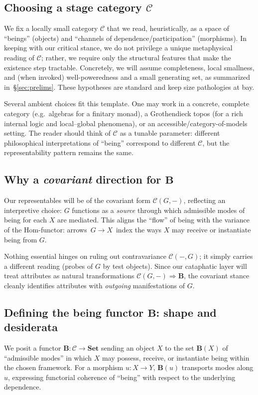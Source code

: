 \documentclass[11pt]{article}
\theoremstyle{upright}
\begin{document}
\subsection{Choosing a stage category \texorpdfstring{$\mathcal C$}{C}}
We fix a locally small category \(\mathcal C\) that we read, heuristically, as a space of ``beings'' (objects) and ``channels of dependence/participation'' (morphisms). In keeping with our critical stance, we do not privilege a unique metaphysical reading of \(\mathcal C\); rather, we require only the structural features that make the existence step tractable. Concretely, we will assume completeness, local smallness, and (when invoked) well-poweredness and a small generating set, as summarized in~\S\ref{sec:prelims}. These hypotheses are standard and keep size pathologies at bay.

Several ambient choices fit this template. One may work in a concrete, complete category (e.g.\ algebras for a finitary monad), a Grothendieck topos (for a rich internal logic and local--global phenomena), or an accessible/category-of-models setting. The reader should think of \(\mathcal C\) as a tunable parameter: different philosophical interpretations of ``being'' correspond to different \(\mathcal C\), but the representability pattern remains the same.

\subsection{Why a \emph{covariant} direction for \texorpdfstring{$\mathbf B$}{B}}
Our representables will be of the covariant form \(\mathcal C(G,-)\), reflecting an interpretive choice: \(G\) functions as a \emph{source} through which admissible modes of being for each \(X\) are mediated. This aligns the ``flow'' of being with the variance of the Hom-functor: arrows \(\,G\!\to\!X\) \,index the ways \(X\) may receive or instantiate being from \(G\).

Nothing essential hinges on ruling out contravariance \(\mathcal C(-,G)\); it simply carries a different reading (probes of \(G\) by test objects). Since our cataphatic layer will treat attributes as natural transformations \(\mathcal C(G,-)\Rightarrow \mathbf B\), the covariant stance cleanly identifies attributes with \emph{outgoing} manifestations of \(G\).

\subsection{Defining the being functor \texorpdfstring{$\mathbf B$}{B}: shape and desiderata}
We posit a functor \(\mathbf B:\mathcal C\to\mathbf{Set}\) sending an object \(X\) to the set \(\mathbf B(X)\) of ``admissible modes'' in which \(X\) may possess, receive, or instantiate being within the chosen framework. For a morphism \(u:X\to Y\), \(\mathbf B(u)\) transports modes along \(u\), expressing functorial coherence of ``being'' with respect to the underlying dependence.
\end{document}
